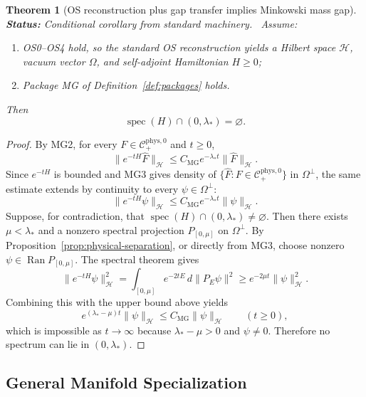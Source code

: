 \documentclass[12pt,a4paper]{article}
\theoremstyle{plain}
\newtheorem{theorem}{Theorem}[section]
\theoremstyle{definition}
\theoremstyle{remark}
\newcommand{\spec}{\operatorname{spec}}
\newcommand{\hilb}{\mathcal{H}}
\newcommand{\status}[1]{\textnormal{\textbf{Status:} #1.}\ }
\begin{document}
\begin{theorem}[OS reconstruction plus gap transfer implies Minkowski mass gap]
  \label{thm:recon-gap}
  \status{Conditional corollary from standard machinery}
  Assume:
  \begin{enumerate}[nosep,label=(\roman*)]
  \item OS0--OS4 hold, so the standard OS reconstruction yields a
    Hilbert space $\hilb$, vacuum vector $\Omega$, and self-adjoint
    Hamiltonian $H \ge 0$;
  \item Package MG of Definition~\ref{def:packages} holds.
  \end{enumerate}
  Then
  \[
    \spec(H)\cap (0,\lambda_*) = \varnothing.
  \]
\end{theorem}
\begin{proof}
  By MG2, for every
  $F \in \mathcal{C}^{\mathrm{phys},0}_+$ and $t\ge 0$,
  \[
    \|e^{-tH}\widehat{F}\|_\hilb
    \le C_{\mathrm{MG}} e^{-\lambda_* t}\|\widehat{F}\|_\hilb.
  \]
  Since $e^{-tH}$ is bounded and MG3 gives density of
  $\{\widehat{F}:F\in \mathcal{C}^{\mathrm{phys},0}_+\}$ in
  $\Omega^\perp$, the same estimate extends by continuity to every
  $\psi \in \Omega^\perp$:
  \[
    \|e^{-tH}\psi\|_\hilb
    \le C_{\mathrm{MG}} e^{-\lambda_* t}\|\psi\|_\hilb.
  \]
  Suppose, for contradiction, that
  $\spec(H)\cap(0,\lambda_*)\neq\varnothing$. Then there exists
  $\mu<\lambda_*$ and a nonzero spectral projection
  $P_{[0,\mu]}$ on $\Omega^\perp$. By
  Proposition~\ref{prop:physical-separation}, or directly from MG3,
  choose nonzero $\psi \in \operatorname{Ran}P_{[0,\mu]}$.
  The spectral theorem gives
  \[
    \|e^{-tH}\psi\|_\hilb^2
    = \int_{[0,\mu]} e^{-2tE}\, d\|P_E\psi\|^2
    \ge e^{-2\mu t}\|\psi\|_\hilb^2.
  \]
  Combining this with the upper bound above yields
  \[
    e^{(\lambda_*-\mu)t}\|\psi\|_\hilb
    \le C_{\mathrm{MG}}\|\psi\|_\hilb
    \qquad (t\ge 0),
  \]
  which is impossible as $t\to\infty$ because $\lambda_*-\mu>0$ and
  $\psi\neq 0$. Therefore no spectrum can lie in $(0,\lambda_*)$.
\end{proof}


\subsection{General Manifold Specialization}
\end{document}

